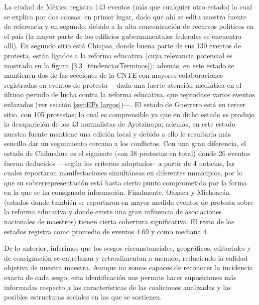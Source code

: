 \documentclass[letterpaper, 11pt]{book}
\theoremstyle{definition}
\theoremstyle{remark}
\begin{document}
La ciudad de México registra 143 eventos (más que cualquier otro estado) lo cual se explica por dos causas: en primer lugar, dado que ahí se edita nuestra fuente de referencia y en segundo, debido a la alta concentración de recursos políticos en el país (la mayor parte de los edificios gubernamentales federales se encuentra allí). 
En segundo sitio está Chiapas, donde buena parte de sus 130 eventos de protesta, están ligados a la reforma educativa (cuya relevancia potencial es mostrada en la figura \ref{3.3_tendenciasTerminos}); además, en este estado se mantienen dos de las secciones de la CNTE con mayores colaboraciones registradas en eventos de protesta ---dada una fuerte atención mediática en el último periodo de lucha contra la reforma educativa, que reproduce varios eventos enlazados (ver sección \ref{sec:EPs largos})---. 
El estado de Guerrero está en tercer sitio, con 105 protestas; lo cual es comprensible ya que en dicho estado se produjo la desaparición de los 43 normalistas de Ayotzinapa; además, en este estado nuestra fuente mantiene una edición local y debido a ello le resultaría más sencillo dar un seguimiento cercano a los conflictos. 
Con una gran diferencia, el estado de Chihuahua es el siguiente (con 38 protestas en total) donde 26 eventos fueron deducidos ---según los criterios adoptados-- a partir de 4 noticias, las cuales reportaron manifestaciones simultáneas en diferentes municipios, por lo que su sobrerrepresentación está hasta cierto punto comprometida por la forma en la que se ha consignado información. 
Finalmente, Oaxaca y Michoacán (estados donde también se reportaron en mayor medida eventos de protesta sobre la reforma educativa y donde existe una gran influencia de asociaciones nacionales de maestros) tienen cierta cobertura significativa. 
El resto de los estados registra como promedio de eventos 4.69 y como mediana 4. 



De lo anterior, inferimos que los sesgos circunstanciales, geográficos, editoriales y de consignación se entrelazan y retroalimentan a menudo, reduciendo la calidad objetiva de nuestra muestra. 
Aunque no somos capaces de reconocer la incidencia exacta de cada sesgo, esta identificación nos permite hacer suposiciones más informadas respecto a las características de las coaliciones analizadas y las posibles estructuras sociales en las que se sostienen. 
\end{document}
